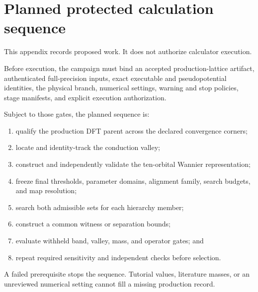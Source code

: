 \documentclass[11pt]{article}
\newenvironment{prospective}{\color{prospectivered}}{}
\begin{document}
\clearpage
\appendix
\begin{prospective}
\section{Planned protected calculation sequence}\label{app:plan}
This appendix records proposed work. It does not authorize calculator execution.

Before execution, the campaign must bind an accepted production-lattice artifact, authenticated full-precision inputs, exact executable and pseudopotential identities, the physical branch, numerical settings, warning and stop policies, stage manifests, and explicit execution authorization.

Subject to those gates, the planned sequence is:

\begin{enumerate}
\item qualify the production DFT parent across the declared convergence corners;
\item locate and identity-track the conduction valley;
\item construct and independently validate the ten-orbital Wannier representation;
\item freeze final thresholds, parameter domains, alignment family, search budgets, and
      map resolution;
\item search both admissible sets for each hierarchy member;
\item construct a common witness or separation bounds;
\item evaluate withheld band, valley, mass, and operator gates; and
\item repeat required sensitivity and independent checks before selection.
\end{enumerate}
A failed prerequisite stops the sequence. Tutorial values, literature masses, or an unreviewed numerical setting cannot fill a missing production record.


\end{prospective}
\end{document}
